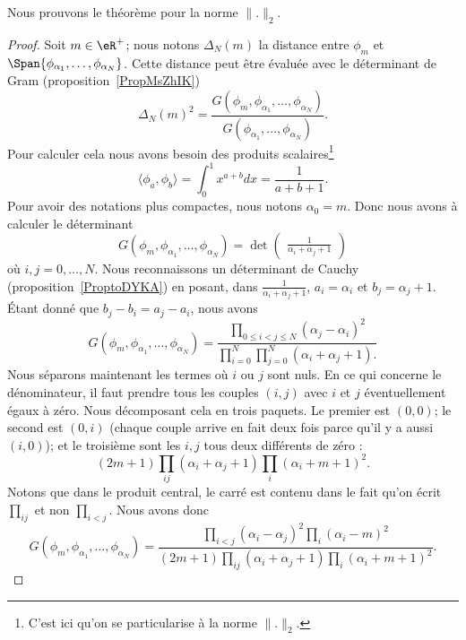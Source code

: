 Nous prouvons le théorème pour la norme \( \| . \|_2\).
\begin{proof}
    Soit \( m\in \eR^+\); nous notons \( \Delta_N(m)\) la distance entre \( \phi_m\) et \( \Span\{ \phi_{\alpha_1},\ldots, \phi_{\alpha_N} \}\). Cette distance peut être évaluée avec le déterminant de Gram (proposition~\ref{PropMsZhIK})
    \begin{equation}
        \Delta_N(m)^2=\frac{ G(\phi_m,\phi_{\alpha_1},\ldots, \phi_{\alpha_N}) }{ G(\phi_{\alpha_1},\ldots, \phi_{\alpha_N}) }.
    \end{equation}
    Pour calculer cela nous avons besoin des produits scalaires\footnote{C'est ici qu'on se particularise à la norme \( \| . \|_2\).}
    \begin{equation}
        \langle \phi_a, \phi_b\rangle =\int_0^1 x^{a+b}dx=\frac{1}{ a+b+1 }.
    \end{equation}
    Pour avoir des notations plus compactes, nous notons \( \alpha_0=m\). Donc nous avons à calculer le déterminant
    \begin{equation}
        G(\phi_m,\phi_{\alpha_1},\ldots, \phi_{\alpha_N})=\det\begin{pmatrix}
            \frac{1}{ \alpha_i+\alpha_j+1 }
         \end{pmatrix}
    \end{equation}
    où \( i,j=0,\ldots, N\). Nous reconnaissons un déterminant de Cauchy (proposition~\ref{ProptoDYKA}) en posant, dans \( \frac{1}{ \alpha_i+\alpha_j+1 }\), \( a_i=\alpha_i\) et \( b_j=\alpha_j+1\). Étant donné que \( b_j-b_i=a_j-a_i\), nous avons
    \begin{equation}
        G(\phi_m,\phi_{\alpha_1},\ldots, \phi_{\alpha_N})=\frac{ \prod_{0\leq i<j\leq N}  (\alpha_j-\alpha_i)^2 }{ \prod_{i=0}^N\prod_{j=0}^N (\alpha_i+\alpha_j+1).}
    \end{equation}
    Nous séparons maintenant les termes où \( i\) ou \( j\) sont nuls. En ce qui concerne le dénominateur, il faut prendre tous les couples \( (i,j)\) avec \( i\) et \( j\) éventuellement égaux à zéro. Nous décomposant cela en trois paquets. Le premier est \( (0,0)\); le second est \( (0,i)\) (chaque couple arrive en fait deux fois parce qu'il y a aussi \( (i,0)\)); et le troisième sont les \( i,j\) tous deux différents de zéro :
    \begin{equation}
        (2m+1)\prod_{ij}(\alpha_i+\alpha_j+1)\prod_i(\alpha_i+m+1)^2.
    \end{equation}
    Notons que dans le produit central, le carré est contenu dans le fait qu'on écrit \( \prod_{ij}\) et non \( \prod_{i<j}\). Nous avons donc
    \begin{equation}
        G(\phi_m,\phi_{\alpha_1},\ldots, \phi_{\alpha_N})=\frac{ \prod_{i<j}(\alpha_i-\alpha_j)^2\prod_i(\alpha_i-m)^2 }{ (2m+1)\prod_{ij}(\alpha_i+\alpha_j+1)\prod_i(\alpha_i+m+1)^2 }.
    \end{equation}


\end{proof}
